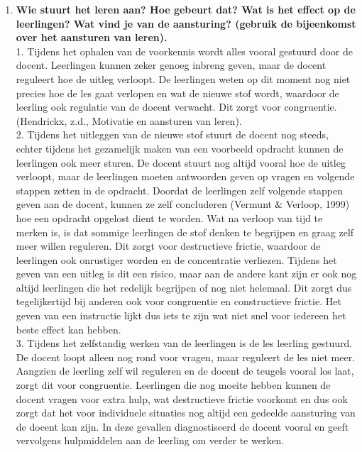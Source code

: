 \documentclass{article}
\begin{document}
\begin{enumerate}[label=(\alph*)]
                \item \textbf{Wie stuurt het leren aan? Hoe gebeurt dat? Wat is het effect op de leerlingen? Wat vind je van de aansturing? (gebruik de bijeenkomst over het aansturen van leren).} \\
                    
                    1. Tijdens het ophalen van de voorkennis wordt alles vooral gestuurd door de docent. Leerlingen kunnen zeker genoeg inbreng geven, maar de docent reguleert hoe de uitleg verloopt. De leerlingen weten op dit moment nog niet precies hoe de les gaat verlopen en wat de nieuwe stof wordt, waardoor de leerling ook regulatie van de docent verwacht. Dit zorgt voor congruentie. (Hendrickx, z.d., Motivatie en aansturen van leren).\\

                    2. Tijdens het uitleggen van de nieuwe stof stuurt de docent nog steeds, echter tijdens het gezamelijk maken van een voorbeeld opdracht kunnen de leerlingen ook meer sturen. De docent stuurt nog altijd vooral hoe de uitleg verloopt, maar de leerlingen moeten antwoorden geven op vragen en volgende stappen zetten in de opdracht. Doordat de leerlingen zelf volgende stappen geven aan de docent, kunnen ze zelf concluderen (Vermunt$\And$Verloop, 1999) hoe een opdracht opgelost dient te worden. Wat na verloop van tijd te merken is, is dat sommige leerlingen de stof denken te begrijpen en graag zelf meer willen reguleren. Dit zorgt voor destructieve frictie, waardoor de leerlingen ook onrustiger worden en de concentratie verliezen. Tijdens het geven van een uitleg is dit een risico, maar aan de andere kant zijn er ook nog altijd leerlingen die het redelijk begrijpen of nog niet helemaal. Dit zorgt dus tegelijkertijd bij anderen ook voor congruentie en constructieve frictie. Het geven van een instructie lijkt dus iets te zijn wat niet snel voor iedereen het beste effect kan hebben.\\

                    3. Tijdens het zelfstandig werken van de leerlingen is de les leerling gestuurd. De docent loopt alleen nog rond voor vragen, maar reguleert de les niet meer. Aangzien de leerling zelf wil reguleren en de docent de teugels vooral los laat, zorgt dit voor congruentie. Leerlingen die nog moeite hebben kunnen de docent vragen voor extra hulp, wat destructieve frictie voorkomt en dus ook zorgt dat het voor individuele situaties nog altijd een gedeelde aansturing van de docent kan zijn. In deze gevallen diagnostiseerd de docent vooral en geeft vervolgens hulpmiddelen aan de leerling om verder te werken.
                    

\end{enumerate}
\end{document}

